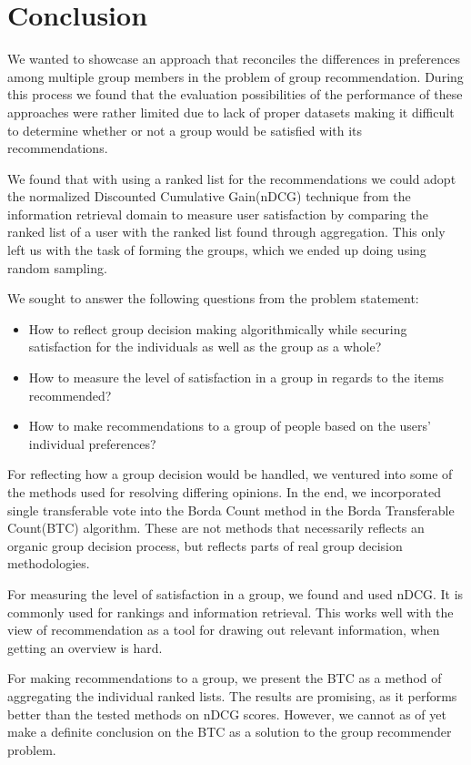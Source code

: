 \chapter{Conclusion} \label{ch:conclusion}
We wanted to showcase an approach that reconciles the differences in preferences among multiple group members in the problem of group recommendation. During this process we found that the evaluation possibilities of the performance of these approaches were rather limited due to lack of proper datasets making it difficult to determine whether or not a group would be satisfied with its recommendations.

We found that with using a ranked list for the recommendations we could adopt the normalized Discounted Cumulative Gain(nDCG) technique from the information retrieval domain to measure user satisfaction by comparing the ranked list of a user with the ranked list found through aggregation. This only left us with the task of forming the groups, which we ended up doing using random sampling.

We sought to answer the following questions from the problem statement:
\begin{itemize}
	\item How to reflect group decision making algorithmically while securing satisfaction for the individuals as well as the group as a whole?
	\item How to measure the level of satisfaction in a group in regards to the items recommended?
	\item How to make recommendations to a group of people based on the users' individual preferences?
\end{itemize}

For reflecting how a group decision would be handled, we ventured into some of the methods used for resolving differing opinions. In the end, we incorporated single transferable vote into the Borda Count method in the Borda Transferable Count(BTC) algorithm. These are not methods that necessarily reflects an organic group decision process, but reflects parts of real group decision methodologies.

For measuring the level of satisfaction in a group, we found and used nDCG. It is commonly used for rankings and information retrieval. This works well with the view of recommendation as a tool for drawing out relevant information, when getting an overview is hard.

For making recommendations to a group, we present the BTC as a method of aggregating the individual ranked lists. The results are promising, as it performs better than the tested methods on nDCG scores. However, we cannot as of yet make a definite conclusion on the BTC as a solution to the group recommender problem.

